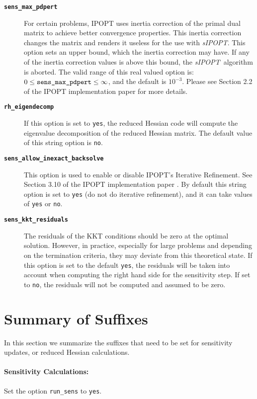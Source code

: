 \documentclass[letter, 11pt]{article}
\newcommand{\sensKKT}{\emph{sIPOPT}}
\newcommand{\runaskkt}{run\_sens}
\newcommand{\maxpdpertopt}{sens\_max\_pdpert}
\newcommand{\eigendecompopt}{rh\_eigendecomp}
\newcommand{\senskktresiduals}{sens\_kkt\_residuals}
\newcommand{\allowinex}{sens\_allow\_inexact\_backsolve}
\begin{document}
\begin{description}
\item[\texttt{\textbf{\maxpdpertopt}}] For certain problems, IPOPT uses inertia correction of the primal dual matrix to achieve better convergence properties. This inertia correction changes the matrix and renders it useless for the use with \sensKKT. This option sets an upper bound, which the inertia correction may have. If any of the inertia correction values is above this bound, the \sensKKT\  algorithm is aborted. The valid range of this real valued option is: $0 \leq \mbox{\texttt{\maxpdpertopt}} \leq \infty$, and the default is $10^{-3}$. Please see Section 2.2 of the IPOPT implementation paper \cite{Waechter2006} for more details.

\item[\texttt{\textbf{\eigendecompopt}}] If this option is set to \texttt{yes}, the reduced Hessian code will compute the eigenvalue decomposition of the reduced Hessian matrix. The default value of this string option is \texttt{no}.

\item[\texttt{\textbf{\allowinex}}] This option is used to enable or disable  IPOPT's Iterative Refinement. See Section 3.10 of the IPOPT implementation paper \cite{Waechter2006}. By default this string option is set to \texttt{yes} (do not do iterative refinement), and it can take values of \texttt{yes} or \texttt{no}.

\item[\texttt{\textbf{\senskktresiduals}}] The residuals of the KKT conditions should be zero at the optimal solution.
  However, in practice, especially for large problems and depending on the termination criteria, they may deviate from this theoretical state. If this option is set to the default \texttt{yes}, the residuals will be taken into account when computing the right hand side for the sensitivity step. If set to \texttt{no}, the residuals will not be computed and assumed to be zero.
\end{description}



\newpage
\appendix
\section{Summary of Suffixes}

In this section we summarize the suffixes that need to be set for sensitivity updates, or reduced Hessian calculations.


\paragraph{Sensitivity Calculations:} Set the option \texttt{{\runaskkt}} to \texttt{yes}.\\
\end{document}
